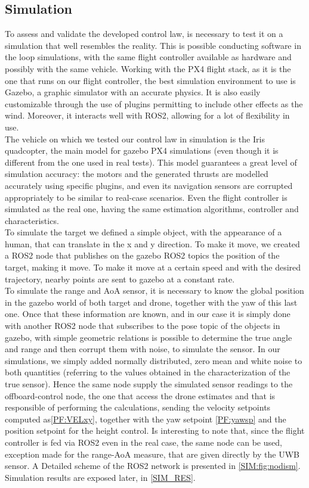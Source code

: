 \subsection{Simulation}
To assess and validate the developed control law, is necessary to test it on a simulation that well resembles the reality.
This is possible conducting software in the loop simulations, with the same flight controller available as hardware and possibly with the same vehicle.
Working with the PX4 flight stack, as it is the one that runs on our flight controller, the best simulation environment to use is Gazebo, a graphic simulator with an accurate physics. It is also easily customizable through the use of plugins permitting to include other effects as the wind. Moreover, it interacts well with ROS2,  allowing for a lot of flexibility in use.\\
The vehicle on which we tested our control law in simulation is the Iris quadcopter, the main model for gazebo PX4 simulations (even though it is different from the one used in real tests). This model guarantees a great level of simulation accuracy: the motors and the generated thrusts are modelled accurately using specific plugins, and even its navigation sensors are corrupted appropriately to be similar to real-case scenarios. Even the flight controller is simulated as the real one, having the same estimation algorithms, controller and characteristics.\\
To simulate the target we defined a simple object, with the appearance of a human, that can translate in the x and y direction. To make it move, we created a ROS2 node that publishes on the gazebo ROS2 topics the position of the target, making it move. To make it move at a certain speed and with the desired trajectory, nearby points are sent to gazebo at a constant rate.\\
To simulate the range and AoA sensor, it is necessary to know the global position in the gazebo world of both target and drone, together with the yaw of this last one. Once that these information are known, and in our case it is simply done with another ROS2 node that subscribes to the pose topic of the objects in gazebo, with simple geometric relations is possible to determine the true angle and range and then corrupt them with noise, to simulate the sensor. In our simulations, we simply added normally distributed, zero mean and white noise to both quantities (referring to the values obtained in the characterization of the true sensor). Hence the same node supply the simulated sensor readings to the offboard-control node, the one that access the drone estimates and that is responsible of performing the calculations, sending the velocity setpoints computed as\eqref{PF:VELxy}, together with the yaw setpoint \eqref{PF:yawsp} and the position setpoint for the height control. Is interesting to note that, since the flight controller is fed via ROS2 even in the real case, the same node can be used, exception made for the range-AoA measure, that are given directly by the UWB sensor. A Detailed scheme of the ROS2 network is presented in \autoref{SIM:fig:nodism}. Simulation results are exposed later, in \autoref{SIM_RES}.